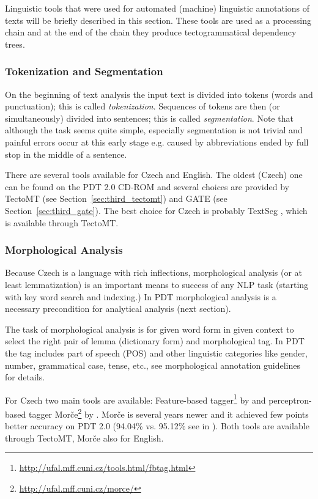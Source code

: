 Linguistic tools that were used for automated (machine) linguistic annotations of texts will be briefly described in this section. These tools are used as a processing chain and at the end of the chain they produce tectogrammatical dependency trees. 


 
\subsubsection{Tokenization and Segmentation} 
On the beginning of text analysis the input text is divided into tokens (words and punctuation); this is called \emph{tokenization}. Sequences of tokens are then (or simultaneously) divided into sentences; this is called \emph{segmentation}. Note that although the task seems quite simple, especially segmentation is not trivial and painful errors occur at this early stage e.g. caused by abbreviations ended by full stop in the middle of a sentence.

There are several tools available for Czech and English. The oldest (Czech) one can be found on the PDT 2.0 CD-ROM \cite{biblio:PDT20_CD} and several choices are provided by TectoMT (see Section~\ref{sec:third_tectomt}) and GATE (see Section~\ref{sec:third_gate}). The best choice for Czech is probably TextSeg \citep{TextSeg}, which is available through TectoMT.


		
\subsubsection{Morphological Analysis}

Because Czech is a language with rich inflections, morphological analysis (or at least lemmatization) is an important means to success of any NLP task (starting with key word search and indexing.) In PDT morphological analysis is a necessary precondition for analytical analysis (next section).

The task of morphological analysis is for given word form in given context to select the right pair of lemma (dictionary form) and morphological tag. In PDT the tag includes part of speech (POS) and other linguistic categories like gender, number, grammatical case, tense, etc., see morphological annotation guidelines for details.

For Czech two main tools are available: Feature-based tagger\footnote{\url{http://ufal.mff.cuni.cz/tools.html/fbtag.html}} by \cite{biblio:HajicMorfTag} and perceptron-based tagger Morče\footnote{\url{http://ufal.mff.cuni.cz/morce/}} by \cite{biblio:VoMorphologicalTagging2006}. Morče is several years newer and it achieved few points better accuracy on PDT 2.0 (94.04\% vs. 95.12\% see in \citep{Spoustova07b}). Both tools are available through TectoMT, Morče also for English.

